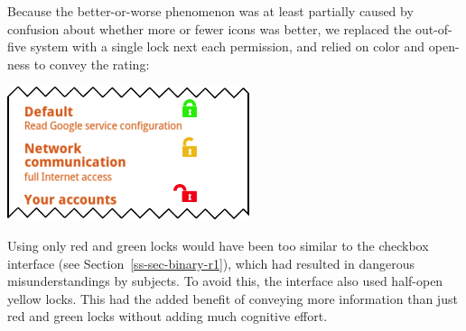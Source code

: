 \documentclass[11pt]{article}
\newcommand{\refsec}[1]{Section~\ref{#1}}
\begin{document}
Because the better-or-worse phenomenon was at least partially caused 
by confusion about whether more or fewer icons was better, we
replaced the out-of-five system with 
a single lock next each permission, and relied on 
color and open-ness to convey the rating:
\label{ss-sec-locks-r3}
\begin{center}
\includegraphics[width=.5\linewidth]{candidate-img/locks/locksR3.png}
\end{center}
Using
only red and green locks would have been too similar to the checkbox
interface (see \refsec{ss-sec-binary-r1}), 
which had resulted in dangerous misunderstandings by subjects. 
To avoid this, the interface also used half-open yellow 
locks. This 
had the added benefit of conveying more 
information than just red and green locks without adding much cognitive 
effort.
\end{document}

